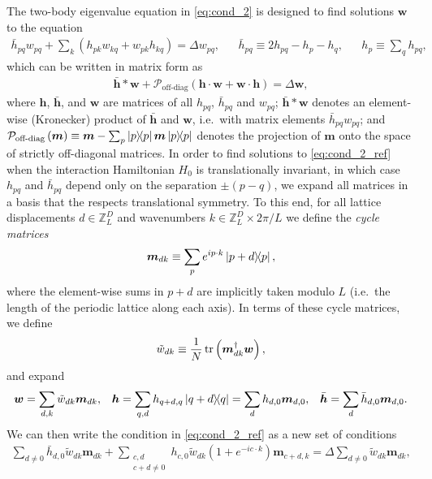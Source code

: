 \documentclass[nofootinbib,notitlepage,11pt]{revtex4-2}
\renewcommand{\t}{\text} %
\newcommand{\f}[2]{\dfrac{#1}{#2}} %
\newcommand{\p}[1]{\left(#1\right)} %
\renewcommand{\c}{\cdot} %
\newcommand{\m}{\bm} %
\newcommand{\1}{\mathds{1}}
\renewcommand{\P}{\mathcal{P}}
\newcommand{\ZZ}{\mathbb{Z}}
\begin{document}
The two-body eigenvalue equation in \eqref{eq:cond_2} is designed to
find solutions $\m w$ to the equation
\begin{align}
  \bar h_{pq} w_{pq}
  + \sum_k \p{h_{pk} w_{kq} + w_{pk} h_{kq}}
  = \Delta w_{pq},
  &&
  \bar h_{pq} \equiv 2h_{pq} - h_p - h_q,
  &&
  h_p \equiv \sum_q h_{pq},
  \label{eq:cond_2_ref_start}
\end{align}
which can be written in matrix form as
\begin{align}
  \bar{\m h}*\m w + \P_{\t{off-diag}}\p{\m h\c\m w + \m w\c\m h}
  = \Delta \m w,
  \label{eq:cond_2_ref}
\end{align}
where $\m h$, $\bar{\m h}$, and $\m w$ are matrices of all $h_{pq}$,
$\bar h_{pq}$ and $w_{pq}$; $\bar{\m h}*\m w$ denotes an element-wise
(Kronecker) product of $\bar{\m h}$ and $\m w$, i.e.~with matrix
elements $\bar h_{pq}w_{pq}$; and
$\P_{\t{off-diag}}\p{\m m}\equiv \m m-\sum_p\op{p}\m m\op{p}$ denotes
the projection of $\m m$ onto the space of strictly off-diagonal
matrices.  In order to find solutions to \eqref{eq:cond_2_ref} when
the interaction Hamiltonian $H_0$ is translationally invariant, in
which case $h_{pq}$ and $\bar h_{pq}$ depend only on the separation
$\pm\p{p-q}$, we expand all matrices in a basis that the respects
translational symmetry.  To this end, for all lattice displacements
$d\in\ZZ_L^D$ and wavenumbers $k\in\ZZ_L^D\times2\pi/L$ we define the
{\it cycle matrices}
\begin{align}
  \m m_{dk} \equiv \sum_p e^{ip\c k} \op{p+d}{p},
  \label{eq:cycle}
\end{align}
where the element-wise sums in $p+d$ are implicitly taken modulo $L$
(i.e.~the length of the periodic lattice along each axis).  In terms
of these cycle matrices, we define
\begin{align}
  \tilde w_{dk} \equiv \f1N \tr\p{\m m_{dk}^\dag \m w},
\end{align}
and expand
\begin{align}
  \m w = \sum_{d,k} \tilde w_{dk} \m m_{dk},
  &&
  \m h = \sum_{q,d} h_{q+d,q} \op{q+d}{q}
  = \sum_d h_{d,0} \m m_{d,0},
  &&
  \bar{\m h} = \sum_d \bar h_{d,0} \m m_{d,0}.
\end{align}
We can then write the condition in \eqref{eq:cond_2_ref} as a new set
of conditions
\begin{align}
  \sum_{d\ne0} \bar h_{d,0} \tilde w_{dk} \m m_{dk}
  + \sum_{\substack{c,d\\c+d\ne0}}
  h_{c,0} \tilde w_{dk} \p{1 + e^{-ic\c k}} \m m_{c+d,k}
  = \Delta \sum_{d\ne0} \tilde w_{dk} \m m_{dk},
\end{align}
\end{document}
